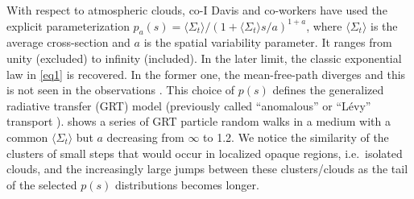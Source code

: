\documentclass[12pt]{article}
\begin{document}
With respect to atmospheric clouds, co-I Davis and co-workers have used the explicit parameterization $p_a(s) = \langle\Sigma_t\rangle/\left(1+\langle\Sigma_t\rangle s/a\right)^{1+a}$, where $\langle\Sigma_t\rangle$ is the average cross-section and $a$ is the spatial variability parameter.
It ranges from unity (excluded) to infinity (included).
In the later limit, the classic exponential law in \cref{eq1} is recovered.
In the former one, the mean-free-path diverges and this is not seen in the observations \cite{schetal06}.
This choice of $p(s)$ defines the generalized radiative transfer (GRT) model \cite{davxu14,xudav16} (previously called ``anomalous'' or ``L\'evy'' transport \cite{davmar97}).
 shows a series of GRT particle random walks in a medium with a common $\langle\Sigma_t\rangle$ but $a$ decreasing from $\infty$ to 1.2.
We notice the similarity of the clusters of small steps that would occur in localized opaque regions, i.e.\ isolated clouds, and the increasingly large jumps between these clusters/clouds as the tail of the selected $p(s)$ distributions becomes longer.
\end{document}
